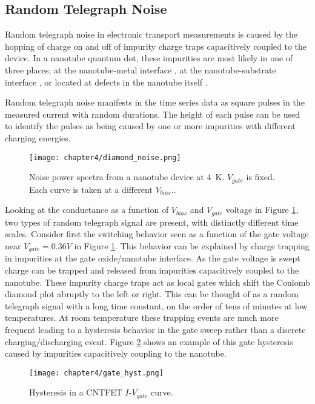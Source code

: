 \subsection{Random Telegraph Noise}
\label{sec:RTN}

Random telegraph noise in electronic transport measurements is caused by the hopping of charge on and off of impurity charge traps capacitively coupled to the device. In a nanotube quantum dot, these impurities are most likely in one of three places; at the nanotube-metal interface \cite{Liu 2006}, at the nanotube-substrate interface \cite{Liu2006, Sydoruk2014}, or located at defects in the nanotube itself \cite{Stokes2010}.

Random telegraph noise manifests in the time series data as square pulses in the measured current with random durations. The height of each pulse can be used to identify the pulses as being caused by one or more impurities with different charging energies.

\begin{figure}
    \centering
    \texttt{[image: chapter4/diamond\_noise.png]}
    \caption{Noise power spectra from a nanotube device at \SI{4}{\kelvin}. $V_{gate}$ is fixed. Each curve is taken at a different $V_{bias}.$.}
    \label{fig:diamond_noise}
\end{figure}

Looking at the conductance as a function of $V_{bias}$ and $V_{gate}$ voltage in Figure \ref{fig:diamond_noise}, two types of random telegraph signal are present, with distinctly different time scales. Consider first the switching behavior seen as a function of the gate voltage near $V_{gate} = 0.36V$ in Figure \ref{fig:diamond_noise}. This behavior can be explained by charge trapping in impurities at the gate oxide/nanotube interface. As the gate voltage is swept charge can be trapped and released from impurities capacitively coupled to the nanotube. These impurity charge traps act as local gates which shift the Coulomb diamond plot abruptly to the left or right. This can be thought of as a random telegraph signal with a long time constant, on the order of tens of minutes at low temperatures. At room temperature these trapping events are much more frequent leading to a hysteresis behavior in the gate sweep rather than a discrete charging/discharging event. Figure \ref{fig:gate_hyst} shows an example of this gate hysteresis caused by impurities capacitively coupling to the nanotube.

\begin{figure}
    \centering
    \texttt{[image: chapter4/gate\_hyst.png]}
    \caption{Hysteresis in a CNTFET $I$-$V_{gate}$ curve.}
    \label{fig:gate_hyst}
\end{figure}

